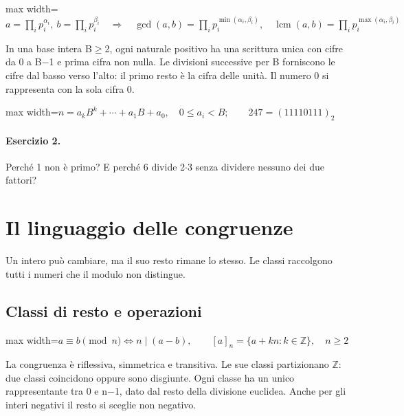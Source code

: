 \documentclass[a4paper,11pt]{article}
\begin{document}
\begin{center}\begin{adjustbox}{max width=\linewidth}$\displaystyle a=\prod_i p_i^{\alpha_i},\ b=\prod_i p_i^{\beta_i}\quad\Longrightarrow\quad\gcd(a,b)=\prod_i p_i^{\min(\alpha_i,\beta_i)},\quad\operatorname{lcm}(a,b)=\prod_i p_i^{\max(\alpha_i,\beta_i)}$\end{adjustbox}\end{center}

In una base intera B$\ge$2, ogni naturale positivo ha una scrittura unica con cifre da 0 a B$-$1 e prima cifra non nulla. Le divisioni successive per B forniscono le cifre dal basso verso l’alto: il primo resto è la cifra delle unità. Il numero 0 si rappresenta con la sola cifra 0.

\begin{center}\begin{adjustbox}{max width=\linewidth}$\displaystyle n=a_kB^k+\cdots+a_1B+a_0,\quad 0\le a_i<B;\qquad247=(11110111)_2$\end{adjustbox}\end{center}

\paragraph{Esercizio 2.} Perché 1 non è primo? E perché 6 divide 2$\cdot$3 senza dividere nessuno dei due fattori?

\section{Il linguaggio delle congruenze}

Un intero può cambiare, ma il suo resto rimane lo stesso. Le classi raccolgono tutti i numeri che il modulo non distingue.

\subsection{Classi di resto e operazioni}

\begin{center}\begin{adjustbox}{max width=\linewidth}$\displaystyle a\equiv b\pmod n\iff n\mid(a-b),\qquad [a]_n=\{a+kn:k\in\mathbb Z\},\quad n\ge2$\end{adjustbox}\end{center}

La congruenza è riflessiva, simmetrica e transitiva. Le sue classi partizionano $\mathbb Z$: due classi coincidono oppure sono disgiunte. Ogni classe ha un unico rappresentante tra 0 e n$-$1, dato dal resto della divisione euclidea. Anche per gli interi negativi il resto si sceglie non negativo.
\end{document}
